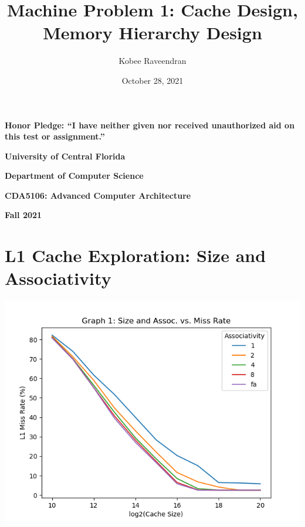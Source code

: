 \documentclass{article}
\title{Machine Problem 1: Cache Design, Memory Hierarchy Design}
\author{Kobee Raveendran}
\date{October 28, 2021}
\begin{document}
    \begin{titlepage}

        \maketitle
        \null  %
        \nointerlineskip  %
        \vfill
        \let\snewpage \newpage
        \let\newpage \relax
        \centering
        {\large \textbf{Honor Pledge: ``I have neither given nor received unauthorized aid on this test or assignment.''}}
        

        \vspace{6cm}
        {\large \textbf{University of Central Florida}}
        
        \vspace{1cm}

        {\large \textbf{Department of Computer Science}}

        \vspace{1cm}

        {\large \textbf{CDA5106: Advanced Computer Architecture}}

        \vspace{1cm}

        {\large \textbf{Fall 2021}}
        \let \newpage \snewpage
        \vfill 
        \break %
        
    \end{titlepage}

    \section{L1 Cache Exploration: Size and Associativity}

    \begin{center}
        \includegraphics[width=\textwidth]{../graph_logs/graph1.png}
    \end{center}
\end{document}
